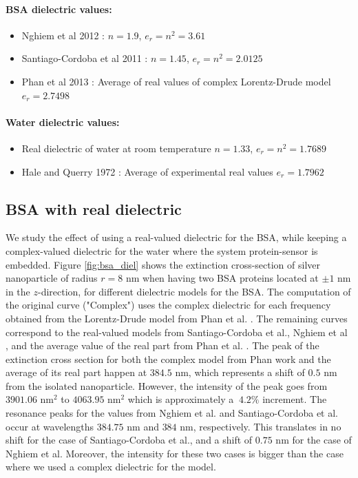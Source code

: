 \paragraph{BSA dielectric values:}
\begin{itemize}
    \item {Nghiem et al 2012 \cite{NghiemETal2012}: $n=1.9$, $e_r = n^2 = 3.61$}
    \item {Santiago-Cordoba et al 2011 \cite{SantiagoCordobaETal2011}: $n=1.45$, $e_r = n^2 = 2.0125$}
    \item {Phan et al 2013 \cite{PhanETal2013}: Average of real values of complex Lorentz-Drude model $e_r = 2.7498$}
\end{itemize}

\paragraph{Water dielectric values:}
\begin{itemize}
    \item {Real dielectric of water at room temperature $n=1.33$, $e_r = n^2 = 1.7689$}
    \item {Hale and Querry 1972 \cite{HaleQuerry1972}: Average of experimental real values $e_r = 1.7962$}
\end{itemize}
  
\subsection{BSA with real dielectric}

We study the effect of using a real-valued dielectric for the BSA, while keeping a complex-valued dielectric for the water where  
the system protein-sensor is embedded. Figure \ref{fig:bsa_diel} shows the extinction cross-section of silver nanoparticle 
of radius $r=8$ nm when having two BSA proteins located at $\pm1$ nm in the $z$-direction, for different dielectric models for the BSA. 
The computation of the original curve ("Complex") uses the complex dielectric for each frequency obtained from the Lorentz-Drude model 
from Phan et al. \cite{PhanETal2013}. The remaining curves correspond to the real-valued models from Santiago-Cordoba et al.\cite{SantiagoCordobaETal2011},
Nghiem et al \cite{NghiemETal2012}, and the average value of the real part from Phan et al. \cite{PhanETal2013}. The peak of the extinction cross section 
for both the complex model from Phan work \cite{PhanETal2013} and the average of its real part happen at $384.5$ nm, which represents a shift of $0.5$ nm from 
the isolated nanoparticle. However, the intensity of the peak goes from $3901.06$ nm$^2$ to $4063.95$ nm$^2$ which is approximately a $~4.2\%$ increment. 
The resonance peaks for the values from Nghiem et al. and Santiago-Cordoba et al. occur at wavelengths $384.75$ nm and $384$ nm, respectively. This translates in 
no shift for the case of Santiago-Cordoba et al., and a shift of $0.75$ nm for the case of Nghiem et al. Moreover, the intensity for these two cases is 
bigger than the case where we used a complex dielectric for the model. 

